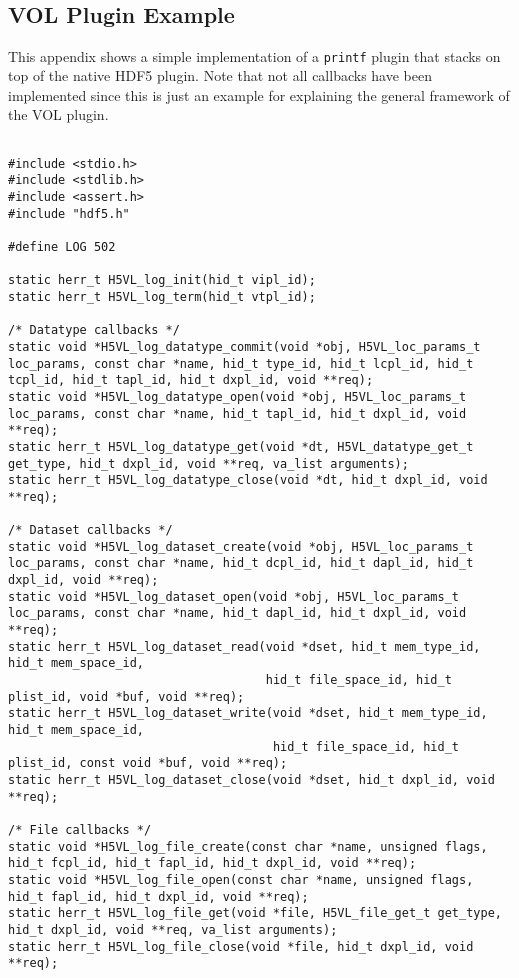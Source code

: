 \begin{appendices}
\section{\\VOL Plugin Example}
\label{sec:A}

This appendix shows a simple implementation of a {\tt printf} plugin that stacks on top of the native HDF5 plugin. Note that not all callbacks have been implemented since this is just an example for explaining the general framework of the VOL plugin.

\begin{lstlisting}

#include <stdio.h>
#include <stdlib.h>
#include <assert.h>
#include "hdf5.h"

#define LOG 502

static herr_t H5VL_log_init(hid_t vipl_id);
static herr_t H5VL_log_term(hid_t vtpl_id);

/* Datatype callbacks */
static void *H5VL_log_datatype_commit(void *obj, H5VL_loc_params_t loc_params, const char *name, hid_t type_id, hid_t lcpl_id, hid_t tcpl_id, hid_t tapl_id, hid_t dxpl_id, void **req);
static void *H5VL_log_datatype_open(void *obj, H5VL_loc_params_t loc_params, const char *name, hid_t tapl_id, hid_t dxpl_id, void **req);
static herr_t H5VL_log_datatype_get(void *dt, H5VL_datatype_get_t get_type, hid_t dxpl_id, void **req, va_list arguments);
static herr_t H5VL_log_datatype_close(void *dt, hid_t dxpl_id, void **req);

/* Dataset callbacks */
static void *H5VL_log_dataset_create(void *obj, H5VL_loc_params_t loc_params, const char *name, hid_t dcpl_id, hid_t dapl_id, hid_t dxpl_id, void **req);
static void *H5VL_log_dataset_open(void *obj, H5VL_loc_params_t loc_params, const char *name, hid_t dapl_id, hid_t dxpl_id, void **req);
static herr_t H5VL_log_dataset_read(void *dset, hid_t mem_type_id, hid_t mem_space_id,
                                    hid_t file_space_id, hid_t plist_id, void *buf, void **req);
static herr_t H5VL_log_dataset_write(void *dset, hid_t mem_type_id, hid_t mem_space_id,
                                     hid_t file_space_id, hid_t plist_id, const void *buf, void **req);
static herr_t H5VL_log_dataset_close(void *dset, hid_t dxpl_id, void **req);

/* File callbacks */
static void *H5VL_log_file_create(const char *name, unsigned flags, hid_t fcpl_id, hid_t fapl_id, hid_t dxpl_id, void **req);
static void *H5VL_log_file_open(const char *name, unsigned flags, hid_t fapl_id, hid_t dxpl_id, void **req);
static herr_t H5VL_log_file_get(void *file, H5VL_file_get_t get_type, hid_t dxpl_id, void **req, va_list arguments);
static herr_t H5VL_log_file_close(void *file, hid_t dxpl_id, void **req);


\end{lstlisting}
\end{appendices}
